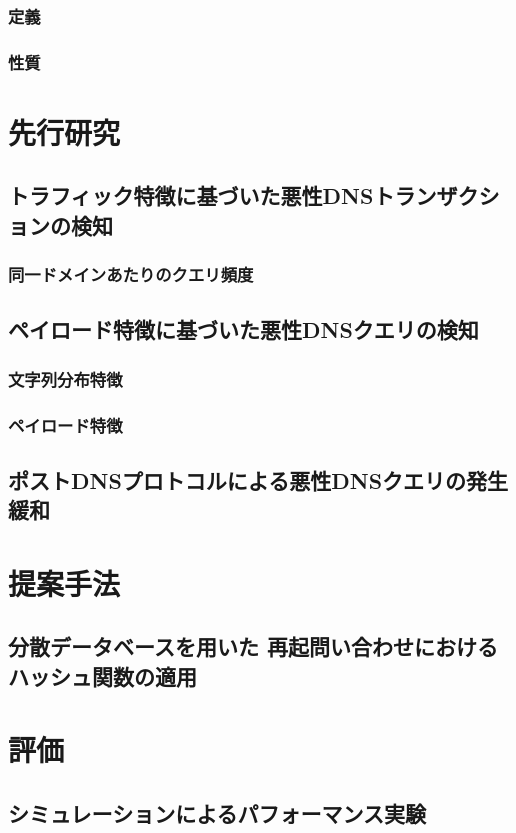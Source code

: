 \documentclass[12pt]{jarticle} %
\begin{document}
\subsubsection{定義}
\subsubsection{性質}


\newpage
\section{先行研究}
\subsection{トラフィック特徴に基づいた悪性DNSトランザクションの検知}
\subsubsection{同一ドメインあたりのクエリ頻度}
\subsection{ペイロード特徴に基づいた悪性DNSクエリの検知}
\subsubsection{文字列分布特徴}
\subsubsection{ペイロード特徴}
\subsection{ポストDNSプロトコルによる悪性DNSクエリの発生緩和}



\newpage
\section{提案手法}
\subsection{分散データベースを用いた
 再起問い合わせにおけるハッシュ関数の適用}


\newpage
\section{評価}
\subsection{シミュレーションによるパフォーマンス実験}
\end{document}
